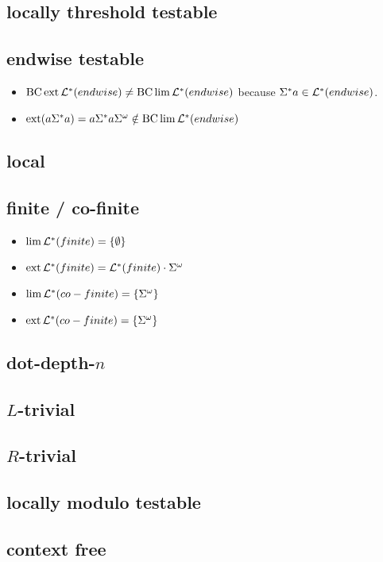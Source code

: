 \subsection{locally threshold testable}
\label{lang:LTT}

\subsection{endwise testable}
\label{lang:endwise}
\begin{itemize}
\item $\operatorname{BC} \operatorname{ext} \mathcal{L}^*(endwise) \neq \operatorname{BC} \lim \mathcal{L}^*(endwise)$ because $\Sigma^*a \in \mathcal{L}^*(endwise)$.
\item $\operatorname{ext}(a\Sigma^* a) = a \Sigma^* a \Sigma^\omega \notin \operatorname{BC} \lim \mathcal{L}^*(endwise)$
\end{itemize}

\subsection{local}
\label{lang:local}
\subsection{finite / co-finite}
\label{lang:finite}
\begin{itemize}
\item $\lim \Lang^*(finite) = \Set{\emptyset}$
\item $\operatorname{ext} \mathcal{L}^*(finite) = \mathcal{L}^*(finite) \cdot \Sigma^\omega$
\item $\lim \Lang^*(co-finite) = \Set{\Sigma^\omega}$
\item $\ext \Lang^*(co-finite) = \Set{\Sigma^\omega}$
\end{itemize}

\subsection{dot-depth-$n$}
\label{lang:dotdepth}
\subsection{$L$-trivial}
\label{lang:Ltrivial}
\subsection{$R$-trivial}
\label{lang:Rtrivial}
\subsection{locally modulo testable}
\label{lang:LmodT}


\subsection{context free}
\label{lang:contextfree}
